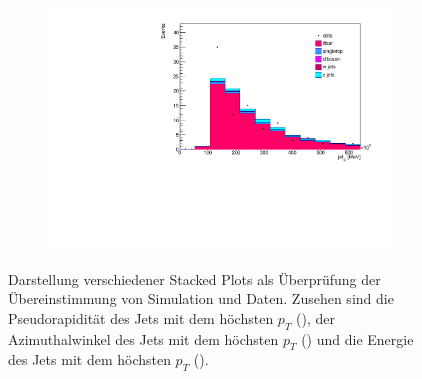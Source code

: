 \begin{figure}[H]
\begin{subfigure}{0.5\textwidth}
    \includegraphics[width=\linewidth]{plots_and_txt/stacked_plots/stacked_jet_E.pdf}
    \caption{}
    \label{fig:stacked_jet_pt_good4}
  \end{subfigure}%
  \caption{Darstellung verschiedener Stacked Plots als Überprüfung der Übereinstimmung von Simulation und Daten.
  Zusehen sind die Pseudorapidität des Jets mit dem höchsten $p_T$ (),  
  der Azimuthalwinkel des Jets mit dem höchsten $p_T$ () und die Energie des Jets mit dem höchsten $p_T$ ().
  }
  \label{fig:stacked_Distributions4}
\end{figure}

